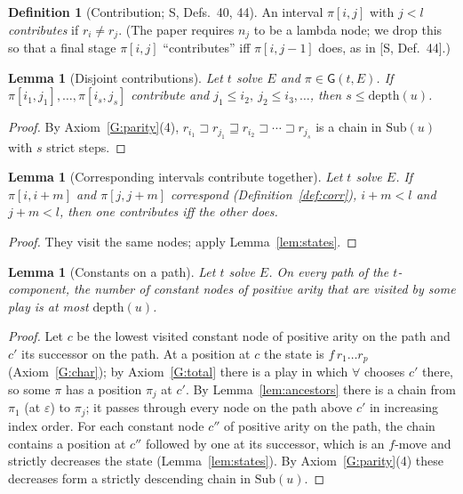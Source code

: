 \documentclass[11pt]{article}
\newcommand{\Sub}{\mathrm{Sub}}
\newcommand{\depth}{\mathrm{depth}}
\newcommand{\Gm}{\mathsf{G}}
\newcommand{\iv}[2]{\pi[#1,#2]}
\theoremstyle{plain}
\newtheorem{lemma}[theorem]{Lemma}
\theoremstyle{definition}
\newtheorem{definition}[theorem]{Definition}
\theoremstyle{remark}
\begin{document}
\begin{definition}[Contribution; S, Defs.~40, 44]\label{def:contrib}
An interval $\iv ij$ with $j<l$ \emph{contributes} if $r_i\ne r_j$.
(The paper requires $n_j$ to be a lambda node; we drop this so that a
final stage $\iv ij$ ``contributes'' iff $\iv i{j-1}$ does, as in [S,
Def.~44].)
\end{definition}

\begin{lemma}[Disjoint contributions]\label{lem:disjoint}
Let $t$ solve $E$ and $\pi\in\Gm(t,E)$.  If $\iv{i_1}{j_1},\dots,
\iv{i_s}{j_s}$ contribute and $j_1\le i_2,\ j_2\le i_3,\dots$, then
$s\le\depth(u)$.
\end{lemma}
\begin{proof}
By Axiom~\ref{G:parity}(4), $r_{i_1}\sqsupset r_{j_1}\sqsupseteq r_{i_2}
\sqsupset\cdots\sqsupset r_{j_s}$ is a chain in $\Sub(u)$ with $s$ strict
steps.
\end{proof}

\begin{lemma}[Corresponding intervals contribute together]\label{lem:corr-contrib}
Let $t$ solve $E$.  If $\iv i{i+m}$ and $\iv j{j+m}$ correspond
(Definition~\ref{def:corr}), $i+m<l$ and $j+m<l$, then one contributes
iff the other does.
\end{lemma}
\begin{proof}
They visit the same nodes; apply Lemma~\ref{lem:states}.
\end{proof}

\begin{lemma}[Constants on a path]\label{lem:constants}
Let $t$ solve $E$.  On every path of the $t$-component, the number of
constant nodes of positive arity that are visited by some play is at
most $\depth(u)$.
\end{lemma}
\begin{proof}
Let $c$ be the lowest visited constant node of positive arity on the
path and $c'$ its successor on the path.  At a position at $c$ the state
is $f\,r_1\dots r_p$ (Axiom~\ref{G:char}); by Axiom~\ref{G:total} there
is a play in which $\forall$ chooses $c'$ there, so some $\pi$ has a
position $\pi_j$ at $c'$.  By Lemma~\ref{lem:ancestors} there is a chain
from $\pi_1$ (at $\varepsilon$) to $\pi_j$; it passes through every node
on the path above $c'$ in increasing index order.  For each constant
node $c''$ of positive arity on the path, the chain contains a position
at $c''$ followed by one at its successor, which is an $f$-move and
strictly decreases the state (Lemma~\ref{lem:states}).  By
Axiom~\ref{G:parity}(4) these decreases form a strictly descending
chain in $\Sub(u)$.
\end{proof}
\end{document}

